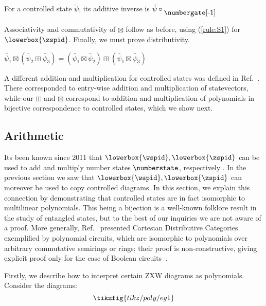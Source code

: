 \begin{lemma}\label{lem:cs_add_inv}
    For a controlled state $\tilde{\psi}$, its additive inverse is $\tilde{\psi} \circ \raisebox{-5pt}{\numbergate[-1]}$
\end{lemma}


Associativity and commutativity of $\boxtimes$ follow as before, using (\ref{rule:S1}) for $\lowerbox{\zspid}$. Finally, we must prove distributivity.


\begin{lemma}\label{lem:cs_dist}
    $\tilde{\psi_1} \boxtimes (\tilde{\psi_2} \boxplus \tilde{\psi_3}) = (\tilde{\psi_1} \boxtimes \tilde{\psi_2}) \boxplus (\tilde{\psi_1} \boxtimes \tilde{\psi_3})$
\end{lemma}

\begin{remark}
    A different addition and multiplication for controlled states was defined in Ref.~\cite{jeandel2018zxconstructive}. There corresponded to entry-wise addition and multiplication of statevectors, while our $\boxplus$ and $\boxtimes$ correspond to addition and multiplication of polynomials in bijective correspondence to controlled states, which we show next.
\end{remark}




\subsection{Arithmetic}

Its been known since 2011 that $\lowerbox{\wspid}, \lowerbox{\zspid}$ can be used to add and multiply number states $\numberstate$, respectively \cite{coecke2011ghz}. In the previous section we saw that $\lowerbox{\wspid}, \lowerbox{\zspid}$ can moreover be used to copy controlled diagrams. In this section, we explain this connection by demonstrating that controlled states are in fact isomorphic to multilinear polynomials. This being a bijection is a well-known folklore result in the study of entangled states, but to the best of our inquiries we are not aware of a proof. More generally, Ref.~\cite{wilson2023diffpolycirc} presented Cartesian Distributive Categories exemplified by polynomial circuits, which are isomorphic to polynomials over arbitrary commutative semirings or rings; their proof is non-constructive, giving explicit proof only for the case of Boolean circuits~\cite{wilson2021revderbool}.

Firstly, we describe how to interpret certain ZXW diagrams as polynomials. Consider the diagrams:
\begin{equation*}
    \tikzfig{tikz/poly/eg1}
\end{equation*}

